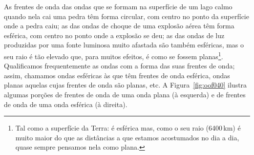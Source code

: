 As frentes de onda das ondas que se formam na superfície de um lago calmo quando
nela cai uma pedra têm forma circular, com centro no ponto da superfície onde a
pedra caiu; as das ondas de choque de uma explosão aérea têm forma esférica, com
centro no ponto onde a explosão se deu; as das ondas de luz produzidas por uma
fonte luminosa muito afastada são também esféricas, mas o seu raio é tão elevado
que, para muitos efeitos, é como se fossem planas\footnote{Tal como a superfície
  da Terra: é esférica mas, como o seu raio (6400\,km) é muito maior do que as
  distâncias a que estamos acostumados no dia a dia, quase sempre pensamos nela
como plana.}. Qualificamos frequentemente as ondas com a forma das suas frentes
de onda; assim, chamamos ondas esféricas às que têm frentes de onda esférica,
ondas planas aquelas cujas frentes de onda são planas, etc. A
Figura~\ref{fig:oof040} ilustra algumas porções de frentes de onda de uma onda
plana (à esquerda) e de frentes de onda de uma onda esférica (à direita).
